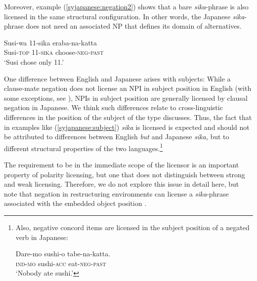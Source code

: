 \documentclass[output=paper]{langscibook}
\begin{document}
Moreover, example (\ref{syjapanese:negation2}) shows that a bare \emph{sika}-phrase is also licensed in the same structural configuration. In other words, the Japanese \emph{sika}-phrase does not need an associated NP that defines its domain of alternatives.

\ea \label{syjapanese:negation2}
\gll Susi-wa 11-sika eraba-na-katta\\
     Susi-\textsc{top} 11-\textsc{sika} choose-\textsc{neg}-\textsc{past}\\
\glt `Susi chose only 11.'\z


One difference between English and Japanese arises with subjects:
While a clause-mate negation does not license an NPI in subject position in English (with some exceptions, see \citealt{uribe95a}), NPIs in subject position are generally licensed by clausal negation in Japanese.
We think such differences relate to cross-linguistic differences in the position of the subject of the type \citet{wurmbrand06a} discusses.
Thus, the fact that in examples like (\ref{syjapanese:subject}) \emph{sika} is licensed is expected and should not be attributed to differences between English \emph{but} and Japanese \emph{sika}, but to different structural properties of the two languages.\footnote{Also, negative concord items are licensed in the subject position of a negated verb in Japanese:

\ea \label{syNegQ-1}
\gll Dare-mo sushi-o tabe-na-katta.\\
\textsc{ind-mo} sushi-\textsc{acc} eat-\textsc{neg}-\textsc{past}\\
\glt `Nobody ate sushi.'\z}


\z


The requirement to be in the immediate scope of the licensor is an important property of polarity licensing, but one that does not distinguish between strong and weak licensing.
Therefore, we do not explore this issue in detail here, but note that negation in restructuring environments \citep{wurmbrand01b} can license a  \emph{sika}-phrase associated with the embedded object position \citep{muraki78}.\largerpage

\end{document}
